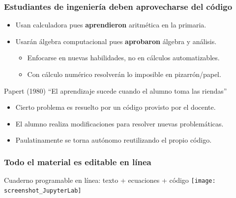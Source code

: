 \documentclass[aspectratio=169]{beamer}
\begin{document}
\begin{frame}
	\frametitle{Estudiantes de ingeniería deben aprovecharse del código}
	\pause
	\begin{block}{}
		\begin{itemize}[<+->]
			\item Usan calculadora pues \textbf{aprendieron} aritmética en la primaria.
			\item Usarán álgebra computacional pues \textbf{aprobaron} álgebra y análisis.
			\begin{itemize}[<+->]
				\item Enfocarse en nuevas habilidades, no en cálculos automatizables.
				\item Con cálculo numérico resolverán lo imposible en pizarrón/papel.
			\end{itemize}
			\end{itemize}
	\end{block}
	\pause
	\begin{block}{}
		Papert (1980) ``El aprendizaje sucede cuando el alumno toma las riendas''
		\begin{itemize}[<+->]
			\item Cierto problema es resuelto por un código provisto por el docente.
			\item El alumno realiza modificaciones para resolver nuevas problemáticas.
			\item Paulatinamente se torna autónomo reutilizando el propio código.
		\end{itemize}
	\end{block}
\end{frame}


\begin{frame}
	\frametitle{Todo el material es editable en línea}
	\pause
	\begin{block}{Cuaderno programable en línea: texto + ecuaciones + código}
		\texttt{[image: screenshot\_JupyterLab]}
	\end{block}
\end{frame}
\end{document}
